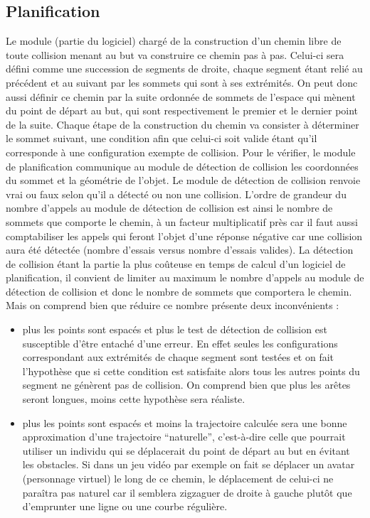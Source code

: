 \documentclass{article}
\begin{document}
\subsection{Planification}
\label{plan}
Le module (partie du logiciel) chargé de la construction d’un chemin libre de toute collision menant au but va construire ce chemin pas à pas. Celui-ci sera défini comme une succession de segments de droite, chaque segment étant relié au précédent et au suivant par les sommets qui sont à ses extrémités. On peut donc aussi définir ce chemin par la suite ordonnée de sommets de l’espace qui mènent du point de départ au but, qui sont respectivement le premier et le dernier point de la suite. Chaque étape de la construction du chemin va consister à déterminer le sommet suivant, une condition afin que celui-ci soit valide étant qu’il corresponde à une configuration exempte de collision. Pour le vérifier, le module de planification communique au module de détection de collision les coordonnées du sommet et la géométrie de l’objet. Le module de détection de collision renvoie vrai ou faux selon qu’il a détecté ou non une collision. L’ordre de grandeur du nombre d’appels au module de détection de collision est ainsi le nombre de sommets que comporte le chemin, à un facteur multiplicatif près car il faut aussi comptabiliser les appels qui feront l’objet d’une réponse négative car une collision aura été détectée (nombre d’essais versus nombre d’essais valides). La détection de collision étant la partie la plus coûteuse en temps de calcul d’un logiciel de planification, il convient de limiter au maximum le nombre d’appels au module de détection de collision et donc le nombre de sommets que comportera le chemin. Mais on comprend bien que réduire ce nombre présente deux inconvénients :
\begin{itemize}
  \item plus les points sont espacés et plus le test de détection de collision est susceptible d’être entaché d’une erreur. En effet seules les configurations correspondant aux extrémités de chaque segment sont testées et on fait l’hypothèse que si cette condition est satisfaite alors tous les autres points du segment ne génèrent pas de collision. On comprend bien que plus les arêtes seront longues, moins cette hypothèse sera réaliste.
  \item plus les points sont espacés et moins la trajectoire calculée sera une bonne approximation d’une trajectoire “naturelle”, c’est-à-dire celle que pourrait utiliser un individu qui se déplacerait du point de départ au but en évitant les obstacles. Si dans un jeu vidéo par exemple on fait se déplacer un avatar (personnage virtuel) le long de ce chemin, le déplacement de celui-ci ne paraîtra pas naturel car il semblera zigzaguer de droite à gauche plutôt que d’emprunter une ligne ou une courbe régulière.
\end{itemize}
\end{document}
